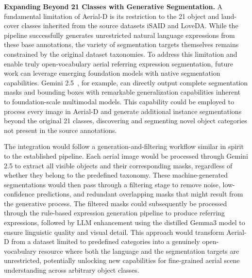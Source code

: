 \textbf{Expanding Beyond 21 Classes with Generative Segmentation.} A fundamental limitation of Aerial-D is its restriction to the 21 object and land-cover classes inherited from the source datasets iSAID and LoveDA. While the pipeline successfully generates unrestricted natural language expressions from these base annotations, the variety of segmentation targets themselves remains constrained by the original dataset taxonomies. To address this limitation and enable truly open-vocabulary aerial referring expression segmentation, future work can leverage emerging foundation models with native segmentation capabilities. Gemini 2.5~\cite{gemini25}, for example, can directly output complete segmentation masks and bounding boxes with remarkable generalization capabilities inherent to foundation-scale multimodal models. This capability could be employed to process every image in Aerial-D and generate additional instance segmentations beyond the original 21 classes, discovering and segmenting novel object categories not present in the source annotations.

The integration would follow a generation-and-filtering workflow similar in spirit to the established pipeline. Each aerial image would be processed through Gemini 2.5 to extract all visible objects and their corresponding masks, regardless of whether they belong to the predefined taxonomy. These machine-generated segmentations would then pass through a filtering stage to remove noise, low-confidence predictions, and redundant overlapping masks that might result from the generative process. The filtered masks could subsequently be processed through the rule-based expression generation pipeline to produce referring expressions, followed by LLM enhancement using the distilled Gemma3 model to ensure linguistic quality and visual detail. This approach would transform Aerial-D from a dataset limited to predefined categories into a genuinely open-vocabulary resource where both the language and the segmentation targets are unrestricted, potentially unlocking new capabilities for fine-grained aerial scene understanding across arbitrary object classes.